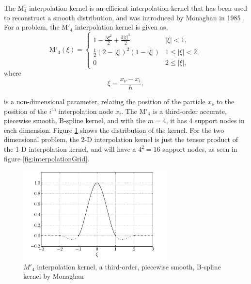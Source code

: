 The $\mathrm{M}^{\prime}_4$ interpolation kernel is an efficient interpolation kernel that has been used to reconstruct a smooth distribution, and was introduced by Monaghan in 1985 \cite{Monaghan1985}. For a  problem, the $\mathrm{M}'_4$ interpolation kernel is given as,
	\begin{equation}
	{\mathrm{M'}_4}\left( {\xi} \right) =
	  \begin{cases}
	   {1 - \frac{{5{\xi ^2}}}{2} + \frac{{3{{\left| \xi  \right|}^3}}}{2}} & {\left| \xi \right|} < 1, \\
	   \frac{1}{2}{\left( {2 - \left| \xi  \right|} \right)^2}\left( {1 - \left| \xi  \right|} \right) & 1 \leqslant {\left| \xi \right|} < 2,\\
	   0 & 2 \leqslant \left| \xi \right|,
	  \end{cases}
	\label{eq:interpKernel}
	\end{equation}
where
	\begin{equation}
	\xi = \frac{x_{\nu} - x_i}{h},
	\label{eq:xiEquation}
	\end{equation}
	
is a non-dimensional parameter, relating the position of the particle $x_{\nu}$ to the position of the $i^{\mathrm{th}}$ interpolation node $x_i$. The $\mathrm{M'}_4$ is a third-order accurate, piecewise smooth, B-spline kernel, and with the $m = 4$, it has 4 support nodes in each dimension. Figure \ref{fig:interpolationKernel} shows the distribution of the kernel. For the two dimensional problem, the 2-D interpolation kernel is just the tensor product of the 1-D interpolation kernel, and will have a $4^2 = 16$ support nodes, as seen in figure \ref{fig:interpolationGrid}.

	\begin{figure}[t]
	\centering
	\includegraphics[width=0.7\textwidth]{figures/lagrangian/interpolationKernel.pdf}
	\caption{$M'_4$ interpolation kernel, a third-order, piecewise smooth, B-spline kernel by Monaghan \cite{Monaghan1985}}
	\label{fig:interpolationKernel}
	\end{figure}

